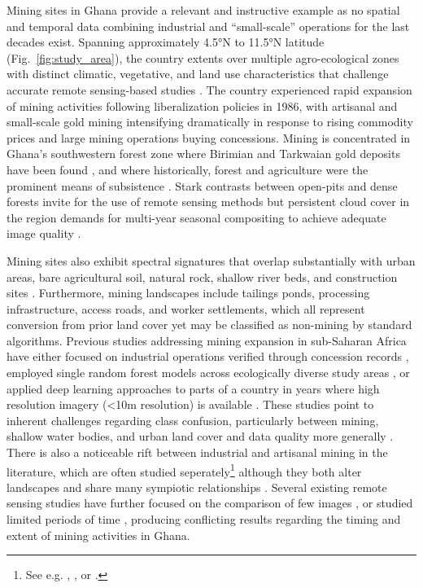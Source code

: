 \documentclass[]{interact}
\begin{document}
Mining sites in Ghana provide a relevant and instructive example as no spatial and temporal data combining industrial and ``small-scale'' operations for the last decades exist. Spanning approximately 4.5°N to 11.5°N latitude (Fig.~\ref{fig:study_area}), the country extents over multiple agro-ecological zones with distinct climatic, vegetative, and land use characteristics that challenge accurate remote sensing-based studies \citep{yamba2023Revisiting}. The country experienced rapid expansion of mining activities following liberalization policies in 1986, with artisanal and small-scale gold mining intensifying dramatically in response to rising commodity prices \citep{mcquilken2016Artisanal,andrews2018Land,wolford2024Global} and large mining operations buying concessions. Mining is concentrated in Ghana's southwestern forest zone where Birimian and Tarkwaian gold deposits have been found \citep{milesi1991metallogenic}, and where historically, forest and agriculture were the prominent means of subsistence \citep[Wills, 1962 cited in ][p.3]{barenblitt2021large}. Stark contrasts between open-pits and dense forests invite for the use of remote sensing methods \citep{barenblitt2021large} but persistent cloud cover in the region demands for multi-year seasonal compositing to achieve adequate image quality \citep{phan2020Land,flood2013Seasonal}.

Mining sites also exhibit spectral signatures that overlap substantially with urban areas, bare agricultural soil, natural rock, shallow river beds, and construction sites \citep{barenblitt2021large,snapir2017Mapping,gallwey2020Sentinel2}. Furthermore, mining landscapes include tailings ponds, processing infrastructure, access roads, and worker settlements, which all represent conversion from prior land cover yet may be classified as non-mining by standard algorithms. Previous studies addressing mining expansion in sub-Saharan Africa have either focused on industrial operations verified through concession records \citep{ahmed2021Where}, employed single random forest models across ecologically diverse study areas \citep{barenblitt2021large}, or applied deep learning approaches to parts of a country in years where high resolution imagery (<10m resolution) is available \citep{gallwey2020Sentinel2,nursamsi2024Remote}. These studies point to inherent challenges regarding class confusion, particularly between mining, shallow water bodies, and urban land cover \citep{barenblitt2021large,zhang2026Geographical} and data quality more generally \citep{nursamsi2024Remote,kattenborn2021Review}. There is also a noticeable rift between industrial and artisanal mining in the literature, which are often studied seperately\footnote{See e.g. \citet{barenblitt2021large}, \citet{gallwey2020Sentinel2}, \citet{ahmed2021Where} or \citet{ros-tonen2021Human}.} although they both alter landscapes and share many sympiotic relationships \citep{ros-tonen2021Human,arthur-holmes2022Women,brunnschweiler2024Opportunities}. Several existing remote sensing studies have further focused on the comparison of few images \citep{obodai2019Land}, or studied limited periods of time \citep{forkuor2020Mapping,gallwey2020Sentinel2}, producing conflicting results regarding the timing and extent of mining activities in Ghana. 
\end{document}
